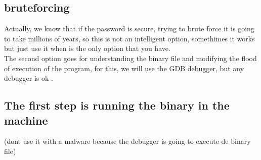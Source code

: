 \documentclass[10pt,a4paper]{article} %
\begin{document}
        \subsection{bruteforcing}

            Actually, we know that if the password is secure, trying to brute force
            it is going to take millions of years, so this is not an intelligent
            option, somethimes it works but just use it when is the only option
            that you have.
            \\ The second option  goes for understanding the binary file and
            modifying the flood of execution of the program, for this, we will use
            the GDB debugger, but any debugger is ok .

        \subsection{The first step is running the binary in the machine }
           \color{red}  (dont use it
            with a malware because the debugger is going to execute de binary
            file)
             \color{white}
\end{document}
